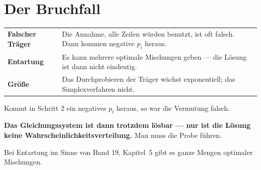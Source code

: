 \section{Der Bruchfall}

\begin{warnung}
\begin{center}
{\small
\renewcommand{\arraystretch}{1.52}
\begin{tabular}{@{}P{2.4cm}P{6.2cm}@{}}
\toprule
\textbf{Falscher Träger} & Die Annahme, alle Zeilen würden benutzt, ist oft falsch. Dann kommen negative $p_i$ heraus.\\
\textbf{Entartung} & Es kann mehrere optimale Mischungen geben --- die Lösung ist dann nicht eindeutig.\\
\textbf{Größe} & Das Durchprobieren der Träger wächst exponentiell; das Simplexverfahren nicht.\\
\bottomrule
\end{tabular}}
\end{center}

Kommt in Schritt 2 ein negatives $p_i$ heraus, so war die Vermutung falsch.

\begin{center}
\begin{minipage}{0.9\textwidth}
\textbf{Das Gleichungssystem ist dann trotzdem lösbar --- nur ist die Lösung keine Wahrscheinlichkeitsverteilung.} Man muss die Probe führen.
\end{minipage}
\end{center}

\begin{center}
\begin{minipage}{0.88\textwidth}
\end{minipage}
\end{center}

Bei Entartung im Sinne von Band 19, Kapitel~5 gibt es ganze Mengen optimaler Mischungen.

\begin{center}
\begin{minipage}{0.88\textwidth}
\end{minipage}
\end{center}
\end{warnung}

